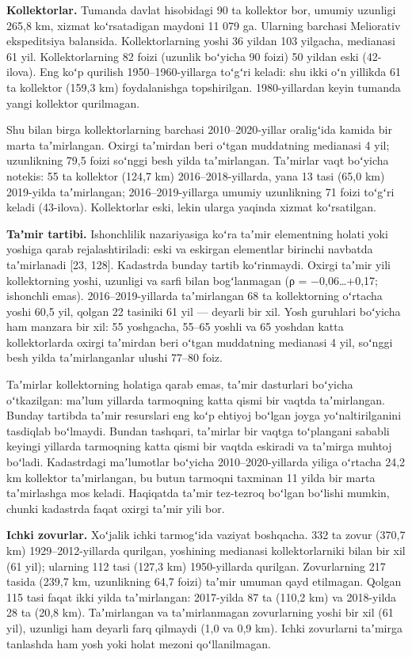\textbf{Kollektorlar.} Tumanda davlat hisobidagi 90 ta kollektor bor,
umumiy uzunligi 265,8 km, xizmat koʻrsatadigan maydoni 11 079 ga.
Ularning barchasi Meliorativ ekspeditsiya balansida. Kollektorlarning
yoshi 36 yildan 103 yilgacha, medianasi 61 yil. Kollektorlarning 82
foizi (uzunlik boʻyicha 90 foizi) 50 yildan eski (42-ilova). Eng koʻp
qurilish 1950--1960-yillarga toʻgʻri keladi: shu ikki oʻn yillikda 61 ta
kollektor (159,3 km) foydalanishga topshirilgan. 1980-yillardan keyin
tumanda yangi kollektor qurilmagan.

Shu bilan birga kollektorlarning barchasi 2010--2020-yillar oraligʻida
kamida bir marta taʼmirlangan. Oxirgi taʼmirdan beri oʻtgan muddatning
medianasi 4 yil; uzunlikning 79,5 foizi soʻnggi besh yilda taʼmirlangan.
Taʼmirlar vaqt boʻyicha notekis: 55 ta kollektor (124,7 km)
2016--2018-yillarda, yana 13 tasi (65,0 km) 2019-yilda taʼmirlangan;
2016--2019-yillarga umumiy uzunlikning 71 foizi toʻgʻri keladi
(43-ilova). Kollektorlar eski, lekin ularga yaqinda xizmat koʻrsatilgan.

\textbf{Taʼmir tartibi.} Ishonchlilik nazariyasiga koʻra taʼmir
elementning holati yoki yoshiga qarab rejalashtiriladi: eski va eskirgan
elementlar birinchi navbatda taʼmirlanadi {[}23, 128{]}. Kadastrda
bunday tartib koʻrinmaydi. Oxirgi taʼmir yili kollektorning yoshi,
uzunligi va sarfi bilan bogʻlanmagan (ρ = −0,06\ldots+0,17; ishonchli
emas). 2016--2019-yillarda taʼmirlangan 68 ta kollektorning oʻrtacha
yoshi 60,5 yil, qolgan 22 tasiniki 61 yil --- deyarli bir xil. Yosh
guruhlari boʻyicha ham manzara bir xil: 55 yoshgacha, 55--65 yoshli va
65 yoshdan katta kollektorlarda oxirgi taʼmirdan beri oʻtgan muddatning
medianasi 4 yil, soʻnggi besh yilda taʼmirlanganlar ulushi 77--80 foiz.

Taʼmirlar kollektorning holatiga qarab emas, taʼmir dasturlari boʻyicha
oʻtkazilgan: maʼlum yillarda tarmoqning katta qismi bir vaqtda
taʼmirlangan. Bunday tartibda taʼmir resurslari eng koʻp ehtiyoj boʻlgan
joyga yoʻnaltirilganini tasdiqlab boʻlmaydi. Bundan tashqari, taʼmirlar
bir vaqtga toʻplangani sababli keyingi yillarda tarmoqning katta qismi
bir vaqtda eskiradi va taʼmirga muhtoj boʻladi. Kadastrdagi maʼlumotlar
boʻyicha 2010--2020-yillarda yiliga oʻrtacha 24,2 km kollektor
taʼmirlangan, bu butun tarmoqni taxminan 11 yilda bir marta taʼmirlashga
mos keladi. Haqiqatda taʼmir tez-tezroq boʻlgan boʻlishi mumkin, chunki
kadastrda faqat oxirgi taʼmir yili bor.

\textbf{Ichki zovurlar.} Xoʻjalik ichki tarmogʻida vaziyat boshqacha.
332 ta zovur (370,7 km) 1929--2012-yillarda qurilgan, yoshining
medianasi kollektorlarniki bilan bir xil (61 yil); ularning 112 tasi
(127,3 km) 1950-yillarda qurilgan. Zovurlarning 217 tasida (239,7 km,
uzunlikning 64,7 foizi) taʼmir umuman qayd etilmagan. Qolgan 115 tasi
faqat ikki yilda taʼmirlangan: 2017-yilda 87 ta (110,2 km) va 2018-yilda
28 ta (20,8 km). Taʼmirlangan va taʼmirlanmagan zovurlarning yoshi bir
xil (61 yil), uzunligi ham deyarli farq qilmaydi (1,0 va 0,9 km). Ichki
zovurlarni taʼmirga tanlashda ham yosh yoki holat mezoni qoʻllanilmagan.

